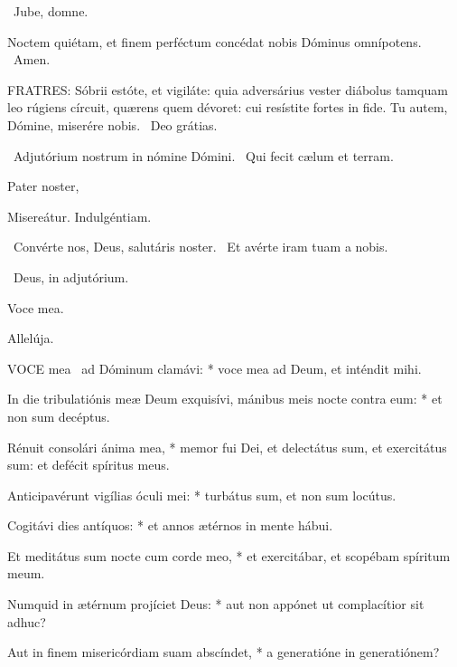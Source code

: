 
\sectionornament


\V\ Jube, domne.

 Noctem quiétam, et finem perféctum concédat nobis Dóminus omnípotens. \R\ Amen.


\lettrine[lines=2]{F}{RATRES}: Sóbrii estóte, et vigiláte: quia adversárius vester diábolus tamquam leo rúgiens círcuit, quærens quem dévoret: cui resístite fortes in fide. Tu autem, Dómine, miserére nobis. \R\ Deo grátias.

\V\ Adjutórium nostrum in nómine Dómini. \R\ Qui fecit cælum et terram.

Pater noster, 

 Misereátur. Indulgéntiam.

\V\ Convérte nos, Deus, salutáris noster. \R\ Et avérte iram tuam a nobis.

\V\ Deus, in adjutórium.


 Voce mea. \textdagger


 Allelúja.


\lettrine[lines=2]{V}{OCE} mea \textdagger\ ad Dóminum clamávi: * voce mea ad Deum, et inténdit mihi.

In die tribulatiónis meæ Deum exquisívi, mánibus meis nocte contra eum: * et non sum decéptus.

Rénuit consolári ánima mea, * memor fui Dei, et delectátus sum, et exercitátus sum: et defécit spíritus meus.

Anticipavérunt vigílias óculi mei: * turbátus sum, et non sum locútus.

Cogitávi dies antíquos: * et annos ætérnos in mente hábui.

Et meditátus sum nocte cum corde meo, * et exercitábar, et scopébam spíritum meum.

Numquid in ætérnum projíciet Deus: * aut non appónet ut complacítior sit adhuc?

Aut in finem misericórdiam suam abscíndet, * a generatióne in generatiónem?


